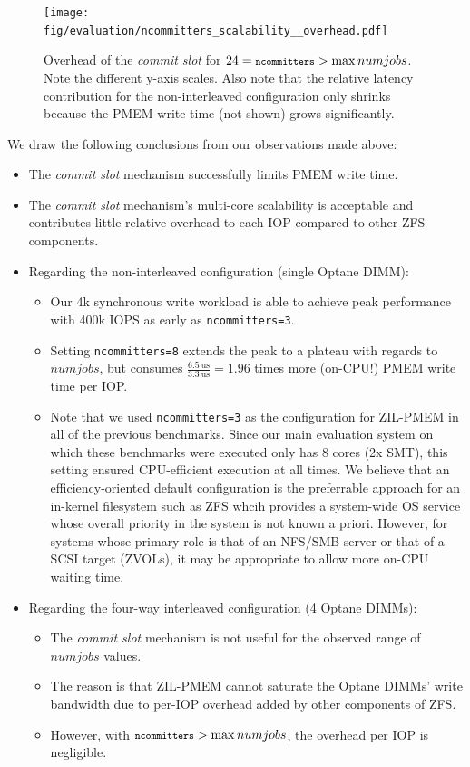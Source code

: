 \documentclass[12pt,a4paper,twoside]{book}
\begin{document}
\begin{figure}[H]
    \centering
    \texttt{[image: fig/evaluation/ncommitters\_scalability\_\_overhead.pdf]}
    \caption{
        Overhead of the \textit{commit slot} for $24 = {\texttt{\footnotesize ncommitters}} > \max numjobs$.
        Note the different y-axis scales.
        Also note that the relative latency contribution for the non-interleaved configuration only shrinks because the PMEM write time (not shown) grows significantly.}
    \label{fig:eval:ncommitters_scalability:overhead}
\end{figure}


We draw the following conclusions from our observations made above:
\begin{itemize}[noitemsep]
    \item The \textit{commit slot} mechanism successfully limits PMEM write time.
    \item The \textit{commit slot} mechanism's multi-core scalability is acceptable and contributes little relative overhead to each IOP compared to other ZFS components.
    \item Regarding the non-interleaved configuration (single Optane DIMM):
        \begin{itemize}
            \item Our 4k synchronous write workload is able to achieve peak performance with 400k IOPS as early as \lstinline{ncommitters=3}.
            \item Setting \lstinline{ncommitters=8} extends the peak to a plateau with regards to $numjobs$, but consumes $\frac{6.5~\text{us}}{3.3~\text{us}} = 1.96$ times more (on-CPU!) PMEM write time per IOP.
            \item Note that we used \lstinline{ncommitters=3} as the configuration for ZIL-PMEM in all of the previous benchmarks.
                Since our main evaluation system on which these benchmarks were executed only has 8 cores (2x SMT), this setting ensured CPU-efficient execution at all times.
                We believe that an efficiency-oriented default configuration is the preferrable approach for an in-kernel filesystem such as ZFS whcih provides a system-wide OS service whose overall priority in the system is not known a priori.
                However, for systems whose primary role is that of an NFS/SMB server or that of a SCSI target (ZVOLs), it may be appropriate to allow more on-CPU waiting time.
        \end{itemize}
    \item Regarding the four-way interleaved configuration (4 Optane DIMMs):
        \begin{itemize}
            \item The \textit{commit slot} mechanism is not useful for the observed range of $numjobs$ values.
            \item The reason is that ZIL-PMEM cannot saturate the Optane DIMMs' write bandwidth due to per-IOP overhead added by other components of ZFS.
            \item However, with ${\texttt{\footnotesize ncommitters}} > \max numjobs$, the overhead per IOP is negligible.
        \end{itemize}
\end{itemize}
\end{document}
